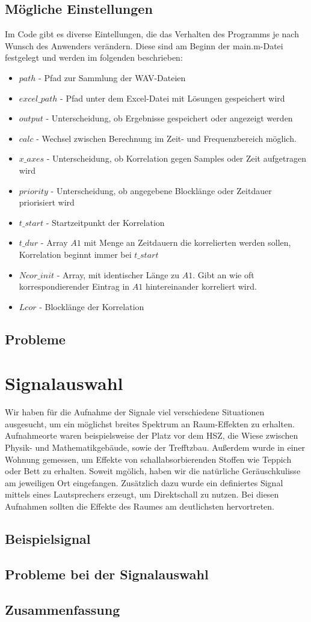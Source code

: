 \documentclass[a4paper, 11pt]{article}
\begin{document}
\subsection{Mögliche Einstellungen}
Im Code gibt es diverse Eintellungen, die das Verhalten des Programms je nach Wunsch des Anwenders verändern. Diese sind am Beginn der main.m-Datei festgelegt und werden im folgenden beschrieben:
\begin{itemize} 
\item $path$ - Pfad zur Sammlung der WAV-Dateien
\item $excel\_path$ - Pfad unter dem Excel-Datei mit Lösungen gespeichert wird
\item $output$ - Unterscheidung, ob Ergebnisse gespeichert oder angezeigt werden
\item $calc$ - Wechsel zwischen Berechnung im Zeit- und Frequenzbereich möglich.
\item $x\_axes$ - Unterscheidung, ob Korrelation gegen Samples oder Zeit aufgetragen wird
\item $priority$ - Unterscheidung, ob angegebene Blocklänge oder Zeitdauer priorisiert wird
\item $t\_start$ - Startzeitpunkt der Korrelation
\item $t\_dur$ - Array $A1$ mit Menge an Zeitdauern die korrelierten werden sollen, Korrelation beginnt immer bei $t\_start$
\item $Ncor\_init$ - Array, mit identischer Länge zu $A1$. Gibt an wie oft korrespondierender Eintrag in $A1$ hintereinander korreliert wird. 
\item $Lcor$ - Blocklänge der Korrelation
\end{itemize}
\subsection{Probleme} 


\section{Signalauswahl}
Wir haben für die Aufnahme der Signale viel verschiedene Situationen ausgesucht, um ein möglichst breites Spektrum an Raum-Effekten zu erhalten. Aufnahmeorte waren beispielsweise der Platz vor dem HSZ, die Wiese zwischen Physik- und Mathematikgebäude, sowie der Trefftzbau. Außerdem wurde in einer Wohnung gemessen, um Effekte von schallabsorbierenden Stoffen wie Teppich oder Bett zu erhalten. Soweit mgölich, haben wir die natürliche Geräuschkulisse am jeweiligen Ort eingefangen. Zusätzlich dazu wurde ein definiertes Signal mittels eines Lautsprechers erzeugt, um Direktschall zu nutzen. Bei diesen Aufnahmen sollten die Effekte des Raumes am deutlichsten hervortreten.
\subsection{Beispielsignal}
\subsection{Probleme bei der Signalauswahl}

\subsection{Zusammenfassung}
\begin{appendix}

\end{appendix}
\end{document}
